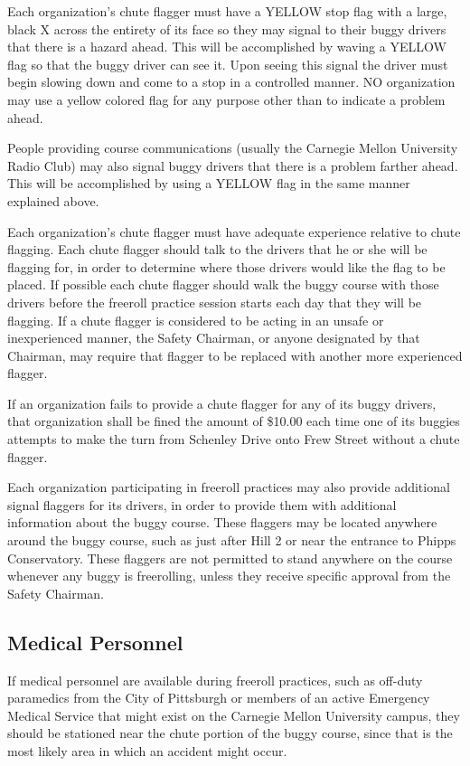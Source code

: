 	Each organization's chute flagger must have a YELLOW stop flag with a large,
	black X across the entirety of its face so they may signal to their buggy drivers 
	that there is a hazard ahead. This will be accomplished by waving a YELLOW flag so 
	that the buggy driver can see it. Upon seeing this signal the driver must begin 
	slowing down and come to a stop in a controlled manner. NO organization may use a 
	yellow colored flag for any purpose other than to indicate a problem ahead.

	People providing course communications (usually the Carnegie Mellon
	University Radio Club) may also signal buggy drivers that there is a problem
	farther ahead. This will be accomplished by using a YELLOW flag in the same
	manner explained above.

	Each organization's chute flagger must have adequate experience relative to
	chute flagging. Each chute flagger should talk to the drivers that he or she
	will be flagging for, in order to determine where those drivers would like the
	flag to be placed. If possible each chute flagger should walk the buggy course
	with those drivers before the freeroll practice session starts each day that
	they will be flagging. If a chute flagger is considered to be acting in an
	unsafe or inexperienced manner, the Safety Chairman, or anyone designated by
	that Chairman, may require that flagger to be replaced with another more
	experienced flagger.

	If an organization fails to provide a chute flagger for any of its buggy
	drivers, that organization shall be fined the amount of \$10.00 each time one
	of its buggies attempts to make the turn from Schenley Drive onto Frew Street
	without a chute flagger.

	Each organization participating in freeroll practices may also provide
	additional signal flaggers for its drivers, in order to provide them with
	additional information about the buggy course. These flaggers may be located
	anywhere around the buggy course, such as just after Hill 2 or near the
	entrance to Phipps Conservatory. These flaggers are not permitted to stand
	anywhere on the course whenever any buggy is freerolling, unless they receive
	specific approval from the Safety Chairman.

\subsection{Medical Personnel}

	If medical personnel are available during freeroll practices, such as off-duty
	paramedics from the City of Pittsburgh or members of an active Emergency
	Medical Service that might exist on the Carnegie Mellon University campus, they
	should be stationed near the chute portion of the buggy course, since that is
	the most likely area in which an accident might occur.

